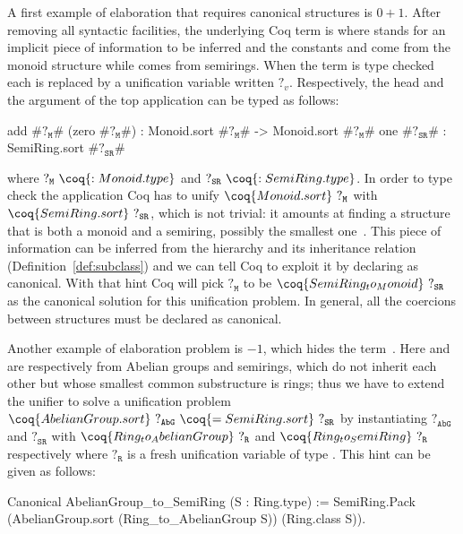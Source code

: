 \documentclass[a4paper,UKenglish,cleveref, autoref]{lipics-v2019}
\theoremstyle{implem}
\theoremstyle{implem}
\theoremstyle{command}
\theoremstyle{commands}
\begin{document}
A first example of elaboration that requires canonical structures is \(0 + 1\).
After removing all syntactic facilities, the underlying Coq term is
 where \coq{_} stands for an implicit piece
of information to be inferred and the constants  and  come
from the monoid structure while  comes from semirings.
When the term is type checked each \coq{_} is replaced by a unification
variable written $?_v$.
Respectively, the head and the argument of the top application
can be typed as follows:
\begin{coqcode}
  add #$?_{\texttt{M}}$# (zero #$?_{\texttt{M}}$#) : Monoid.sort #$?_{\texttt{M}}$# -> Monoid.sort #$?_{\texttt{M}}$#
  one #$?_{\texttt{SR}}$# : SemiRing.sort #$?_{\texttt{SR}}$#
\end{coqcode}
where \(?_{\texttt{M}}~\coq{: Monoid.type}\) and
\(?_{\texttt{SR}}~\coq{: SemiRing.type}\).
In order to type check the application Coq has to unify \(\coq{Monoid.sort}~?_{\texttt{M}}\) with
\(\coq{SemiRing.sort}~?_{\texttt{SR}}\), which is not trivial: it amounts at
finding a structure that is both a monoid and a semiring, possibly the
smallest one~\cite[Sect.~4]{KSdraft}.
This piece of information can be inferred from the hierarchy and its inheritance
relation (Definition~\ref{def:subclass}) and we can tell Coq to exploit it by
declaring  as
canonical. With that hint Coq will pick \(?_{\texttt{M}}\) to be
\(\coq{SemiRing_to_Monoid}~?_{\texttt{SR}}\) as the canonical solution for this
unification problem.
In general, all the coercions between structures must be declared
as canonical. %

Another example of elaboration problem is \(- 1\), which hides the term~.
Here  and  are respectively from Abelian groups and semirings,
which do not inherit each other but whose smallest common substructure is
rings; thus we have to extend the unifier to solve a unification problem
\(\coq{AbelianGroup.sort}~?_{\texttt{AbG}}~\coq{= SemiRing.sort}~?_{\texttt{SR}}\) by instantiating \(?_{\texttt{AbG}}\) and \(?_{\texttt{SR}}\) with \(\coq{Ring_to_AbelianGroup}~?_{\texttt{R}}\) and \(\coq{Ring_to_SemiRing}~?_{\texttt{R}}\) respectively where \(?_{\texttt{R}}\) is a fresh unification variable of type .
This hint can be given as follows:%
\begin{coqcode}
Canonical AbelianGroup_to_SemiRing (S : Ring.type) :=
  SemiRing.Pack (AbelianGroup.sort (Ring_to_AbelianGroup S)) (Ring.class S)).
\end{coqcode}
\end{document}
